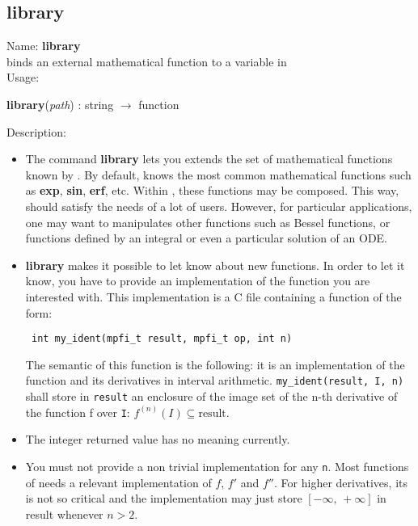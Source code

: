 \subsection{library}
\label{lablibrary}
\noindent Name: \textbf{library}\\
binds an external mathematical function to a variable in \sollya\\

\noindent Usage: 
\begin{center}
\textbf{library}(\emph{path}) : \textsf{string} $\rightarrow$ \textsf{function}\\
\end{center}
\noindent Description: \begin{itemize}

\item The command \textbf{library} lets you extends the set of mathematical
   functions known by \sollya.
   By default, \sollya knows the most common mathematical functions such
   as \textbf{exp}, \textbf{sin}, \textbf{erf}, etc. Within \sollya, these functions may be
   composed. This way, \sollya should satisfy the needs of a lot of
   users. However, for particular applications, one may want to
   manipulates other functions such as Bessel functions, or functions
   defined by an integral or even a particular solution of an ODE.

\item \textbf{library} makes it possible to let \sollya know about new functions. In
   order to let it know, you have to provide an implementation of the
   function you are interested with. This implementation is a C file containing
   a function of the form:
   \begin{verbatim} int my_ident(mpfi_t result, mpfi_t op, int n)\end{verbatim}
   The semantic of this function is the following: it is an implementation of
   the function and its derivatives in interval arithmetic.
   \verb|my_ident(result, I, n)| shall store in \verb|result| an enclosure 
   of the image set of the n-th derivative
   of the function f over \verb|I|: $f^{(n)}(I) \subseteq \mathrm{result}$.

\item The integer returned value has no meaning currently.

\item You must not provide a non trivial implementation for any \verb|n|. Most functions
   of \sollya needs a relevant implementation of $f$, $f'$ and $f''$. For higher 
   derivatives, its is not so critical and the implementation may just store 
   $[-\infty,\,+\infty]$ in result whenever $n>2$.


\end{itemize}
